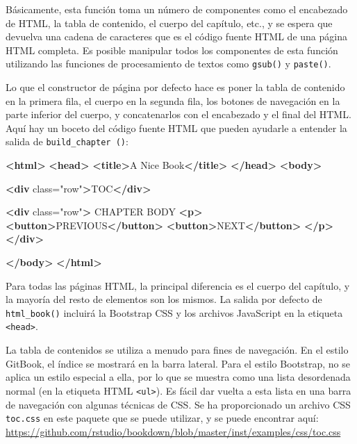 \documentclass[12pt,]{krantz}
\makeatletter
\newenvironment{Shaded}{\begin{snugshade}}{\end{snugshade}}
\newcommand{\KeywordTok}[1]{\textcolor[rgb]{0.13,0.29,0.53}{\textbf{#1}}}
\newcommand{\StringTok}[1]{\textcolor[rgb]{0.31,0.60,0.02}{#1}}
\newcommand{\OtherTok}[1]{\textcolor[rgb]{0.56,0.35,0.01}{#1}}
\newcommand{\NormalTok}[1]{#1}
\newenvironment{kframe}{%
\medskip{}
\setlength{\fboxsep}{.8em}
 \def\at@end@of@kframe{}%
 \ifinner\ifhmode%
  \def\at@end@of@kframe{\end{minipage}}%
  \begin{minipage}{\columnwidth}%
 \fi\fi%
 \def\FrameCommand##1{\hskip\@totalleftmargin \hskip-\fboxsep
 \colorbox{shadecolor}{##1}\hskip-\fboxsep
     \hskip-\linewidth \hskip-\@totalleftmargin \hskip\columnwidth}%
 \MakeFramed {\advance\hsize-\width
   \@totalleftmargin\z@ \linewidth\hsize
   \@setminipage}}%
 {\par\unskip\endMakeFramed%
 \at@end@of@kframe}
\renewenvironment{Shaded}{\begin{kframe}}{\end{kframe}}
\theoremstyle{definition}
\theoremstyle{definition}
\theoremstyle{definition}
\theoremstyle{remark}
\makeatother
\begin{document}
Básicamente, esta función toma un número de componentes como el
encabezado de HTML, la tabla de contenido, el cuerpo del capítulo, etc.,
y se espera que devuelva una cadena de caracteres que es el código
fuente HTML de una página HTML completa. Es posible manipular todos los
componentes de esta función utilizando las funciones de procesamiento de
textos como \texttt{gsub()} y \texttt{paste()}.

Lo que el constructor de página por defecto hace es poner la tabla de
contenido en la primera fila, el cuerpo en la segunda fila, los botones
de navegación en la parte inferior del cuerpo, y concatenarlos con el
encabezado y el final del HTML. Aquí hay un boceto del código fuente
HTML que pueden ayudarle a entender la salida de
\texttt{build\_chapter\ ()}:

\begin{Shaded}
\begin{Highlighting}[]
\KeywordTok{<html>}
  \KeywordTok{<head>}
    \KeywordTok{<title>}\NormalTok{A Nice Book}\KeywordTok{</title>}
  \KeywordTok{</head>}
  \KeywordTok{<body>}
  
    \KeywordTok{<div}\OtherTok{ class=}\StringTok{"row"}\KeywordTok{>}\NormalTok{TOC}\KeywordTok{</div>}
    
    \KeywordTok{<div}\OtherTok{ class=}\StringTok{"row"}\KeywordTok{>}
\NormalTok{      CHAPTER BODY}
      \KeywordTok{<p>}
        \KeywordTok{<button>}\NormalTok{PREVIOUS}\KeywordTok{</button>}
        \KeywordTok{<button>}\NormalTok{NEXT}\KeywordTok{</button>}
      \KeywordTok{</p>}
    \KeywordTok{</div>}
  
  \KeywordTok{</body>}
\KeywordTok{</html>}
\end{Highlighting}
\end{Shaded}

Para todas las páginas HTML, la principal diferencia es el cuerpo del
capítulo, y la mayoría del resto de elementos son los mismos. La salida
por defecto de \texttt{html\_book()} incluirá la Bootstrap CSS y los
archivos JavaScript en la etiqueta
\texttt{\textless{}head\textgreater{}}.

La tabla de contenidos se utiliza a menudo para fines de navegación. En
el estilo GitBook, el índice se mostrará en la barra lateral. Para el
estilo Bootstrap, no se aplica un estilo especial a ella, por lo que se
muestra como una lista desordenada normal (en la etiqueta HTML
\texttt{\textless{}ul\textgreater{}}). Es fácil dar vuelta a esta lista
en una barra de navegación con algunas técnicas de CSS. Se ha
proporcionado un archivo CSS \texttt{toc.css} en este paquete que se
puede utilizar, y se puede encontrar aquí:
\url{https://github.com/rstudio/bookdown/blob/master/inst/examples/css/toc.css}
\end{document}
